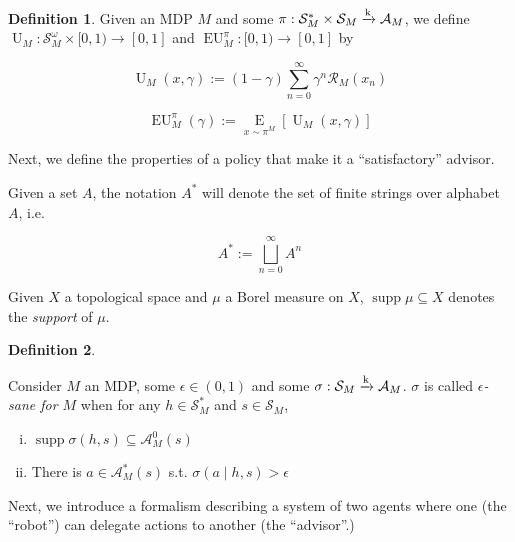 \documentclass[11pt]{article}
\theoremstyle{definition}
\newtheorem{definition}{Definition}%
\theoremstyle{plain}
\DeclareMathOperator{\Supp}{supp}
\newcommand{\AP}[1]{\left(#1\right)}
\newcommand{\AB}[1]{\left[#1\right]}
\newcommand{\Ea}[2]{\underset{#1}{\operatorname{E}}\AB{#2}}
\newcommand{\K}{\xrightarrow{\textnormal{k}}}
\newcommand{\A}{\mathcal{A}}
\newcommand{\St}{\mathcal{S}}
\newcommand{\R}{\mathcal{R}}
\newcommand{\Ut}{\operatorname{U}}
\newcommand{\EU}{\operatorname{EU}}
\begin{document}
\begin{samepage}
\begin{definition}

Given an MDP $M$ and some $\pi: \St_M^* \times \St_M \K \A_M$, we define $\Ut_M: \St_M^\omega \times [0,1) \rightarrow [0,1]$ and $\EU_M^\pi: [0,1) \rightarrow [0,1]$ by

\begin{equation}
\Ut_M(x,\gamma) := (1-\gamma)\sum_{n=0}^\infty {\gamma^n \R_M\AP{x_n}}
\end{equation}

\begin{equation}
\EU_M^\pi(\gamma) := \Ea{x\sim\pi^M}{\Ut_M(x,\gamma)}
\end{equation}

\end{definition}
\end{samepage}

Next, we define the properties of a policy that make it a \enquote{satisfactory} advisor.

Given a set $A$, the notation $A^*$ will denote the set of finite strings over alphabet $A$, i.e.

\[A^* := \bigsqcup_{n = 0}^\infty A^n\]

Given $X$ a topological space and $\mu$ a Borel measure on $X$, $\Supp{\mu} \subseteq X$ denotes the \emph{support} of $\mu$.

\begin{samepage}
\begin{definition}
\label{def:sane}

Consider $M$ an MDP, some $\epsilon\in(0,1)$ and some $\sigma: \St_M \K \A_M$. $\sigma$ is called \emph{$\epsilon$-sane for $M$} when for any $h \in \St_M^*$ and $s \in \St_M$,

\begin{enumerate}[i.]
\item\label{con:def__sane__safe} $\Supp{\sigma(h,s)} \subseteq \A_M^0\AP{s}$
\item\label{con:def__sane__bold} There is $a \in \A_M^*(s)$ s.t. $\sigma(a \mid h,s) > \epsilon$
\end{enumerate}

\end{definition}
\end{samepage}

Next, we introduce a formalism describing a system of two agents where one (the \enquote{robot}) can delegate actions to another (the \enquote{advisor}.)
\end{document}
